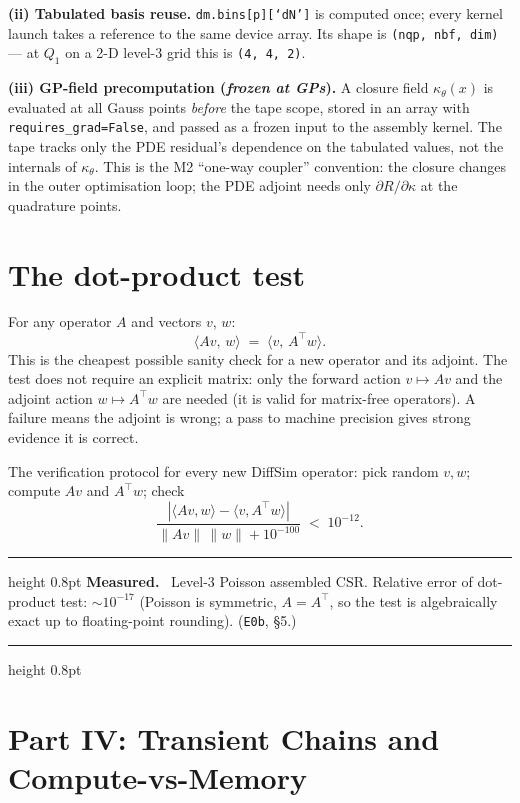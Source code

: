 \documentclass[11pt]{article}
\newenvironment{measured}{%
  \par\medskip\noindent\begin{minipage}{\linewidth}
  \hrule height 0.8pt \smallskip
  \textbf{Measured.}\ }{%
  \smallskip\hrule height 0.8pt \end{minipage}\par\medskip}
\begin{document}
\textbf{(ii) Tabulated basis reuse.}  \texttt{dm.bins[p][`dN']} is
computed once; every kernel launch takes a reference to the same device
array.  Its shape is \texttt{(nqp, nbf, dim)} --- at $Q_1$ on a 2-D
level-3 grid this is \texttt{(4, 4, 2)}.

\textbf{(iii) GP-field precomputation (\emph{frozen at GPs}).}  A
closure field $\kappa_\theta(x)$ is evaluated at all Gauss points
\emph{before} the tape scope, stored in an array with
\mbox{\texttt{requires\_grad=False}}, and passed as a frozen input
to the assembly kernel.  The tape tracks only the PDE residual's
dependence on the tabulated values, not the internals of
$\kappa_\theta$.  This is the M2 ``one-way coupler'' convention:
the closure changes in the outer optimisation loop; the PDE adjoint
needs only $\partial R/\partial \kappa$ at the quadrature points.

\section{The dot-product test}
\label{sec:dotproduct}

For any operator $A$ and vectors $v$, $w$:
\begin{equation}
  \langle A v,\, w \rangle \;=\; \langle v,\, A^\top w \rangle .
  \label{eq:dottest}
\end{equation}
This is the cheapest possible sanity check for a new operator and its
adjoint.  The test does not require an explicit matrix: only the
forward action $v \mapsto Av$ and the adjoint action $w \mapsto A^\top w$
are needed (it is valid for matrix-free operators).  A failure means the
adjoint is wrong; a pass to machine precision gives strong evidence it
is correct.

The verification protocol for every new DiffSim operator: pick random
$v, w$; compute $Av$ and $A^\top w$; check
\[
  \frac{|\langle Av,w\rangle - \langle v,A^\top w\rangle|}
  {\|Av\|\,\|w\| + 10^{-100}}
  \;<\; 10^{-12} .
\]

\begin{measured}
Level-3 Poisson assembled CSR.  Relative error of dot-product test:
$\sim 10^{-17}$ (Poisson is symmetric, $A = A^\top$, so the test is
algebraically exact up to floating-point rounding).
(\texttt{E0b}, \S5.)
\end{measured}

\section*{Part IV: Transient Chains and Compute-vs-Memory}
\end{document}

